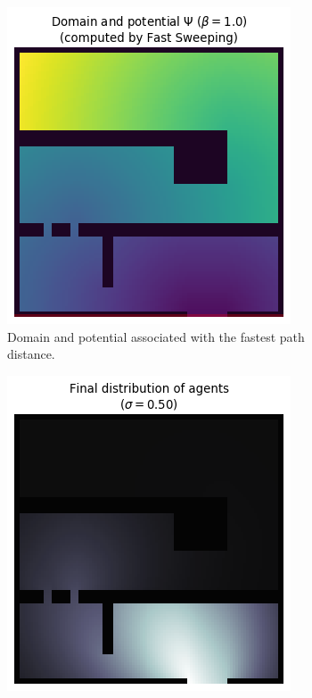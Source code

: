 \documentclass[../report.tex]{subfiles}
\begin{document}
\begin{figure}
	\centering
	\begin{subfigure}[t]{.4\linewidth}
		\centering
		\includegraphics[width=\linewidth]{../project/images/crowd_eikonal_potential.png}
		\caption{Domain and potential associated with the fastest path distance.}\label{fig:CrowdShortedPathPotential}
	\end{subfigure}
	\begin{subfigure}[t]{.4\linewidth}
		\centering
		\includegraphics[width=\linewidth]{../project/images/eikonal_transport_lowvisc.png}

\end{subfigure}
\end{figure}
\end{document}
